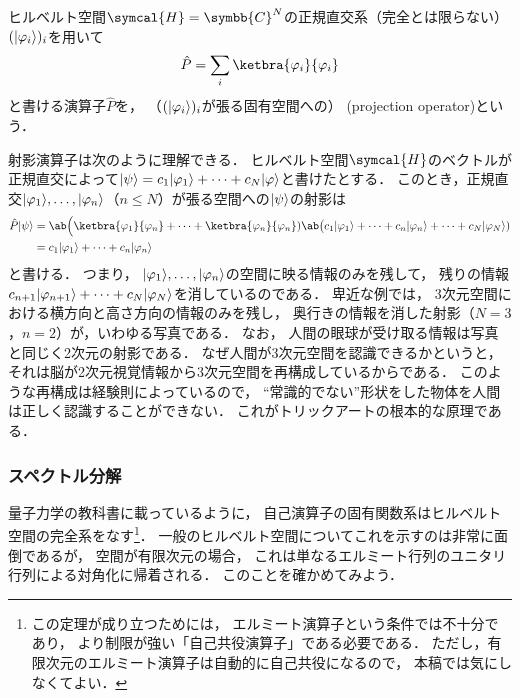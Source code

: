 \documentclass[
]{sotsu}
\begin{document}
ヒルベルト空間$\symcal{H} = \symbb{C}^N$の正規直交系（完全とは限らない）$\sequ{\ket{\varphi_i}}[i]$を用いて
\begin{equation*}
    \hat{P} = \sum_i \ketbra{\varphi_i}{\varphi_i}
\end{equation*}
と書ける演算子$\hat{P}$を，
（$\sequ{\ket{\varphi_i}}[i]$が張る固有空間への）
(projection operator)という．

射影演算子は次のように理解できる．
ヒルベルト空間$\symcal{H}$のベクトルが正規直交によって$\lvert\psi\rangle = c_1 \lvert\varphi_1\rangle + \dots + c_N \lvert\varphi\rangle$と書けたとする．
このとき，正規直交$\lvert\varphi_1\rangle, \dots, \lvert\varphi_n\rangle$（$n \leq N$）が張る空間への$\lvert\psi\rangle$の射影は
\begin{equation*}
    \begin{split}
        \hat{P} \ket{\psi}
            &= \ab\Big( \ketbra{\varphi_1}{\varphi_n} + \dots + \ketbra{\varphi_n}{\varphi_n} )
                \ab\big( c_1 \ket{\varphi_1} + \dots + c_n \ket{\varphi_n} + \dots + c_N \ket{\varphi_N} )
            \\
            &= c_1 \ket{\varphi_1} + \dots + c_n \ket{\varphi_n}
    \end{split}
\end{equation*}
と書ける．
つまり，
$\lvert\varphi_1\rangle, \dots, \lvert\varphi_n\rangle$の空間に映る情報のみを残して，
残りの情報$c_{n+1} \lvert\varphi_{n+1}\rangle + \dots + c_N \lvert\varphi_N\rangle$を消しているのである．
卑近な例では，
3次元空間における横方向と高さ方向の情報のみを残し，
奥行きの情報を消した射影（$N = 3$，$n = 2$）が，いわゆる写真である．
なお，
人間の眼球が受け取る情報は写真と同じく2次元の射影である．
なぜ人間が3次元空間を認識できるかというと，
それは脳が2次元視覚情報から3次元空間を再構成しているからである．
このような再構成は経験則によっているので，
``常識的でない''形状をした物体を人間は正しく認識することができない．
これがトリックアートの根本的な原理である．




\subsubsection{スペクトル分解}

量子力学の教科書に載っているように，
自己演算子の固有関数系はヒルベルト空間の完全系をなす\footnote{
    この定理が成り立つためには，
    エルミート演算子という条件では不十分であり，
    より制限が強い「自己共役演算子」である必要である．
    ただし，有限次元のエルミート演算子は自動的に自己共役になるので，
    本稿では気にしなくてよい．
}．
一般のヒルベルト空間についてこれを示すのは非常に面倒であるが，
空間が有限次元の場合，
これは単なるエルミート行列のユニタリ行列による対角化に帰着される．
このことを確かめてみよう．
\end{document}
